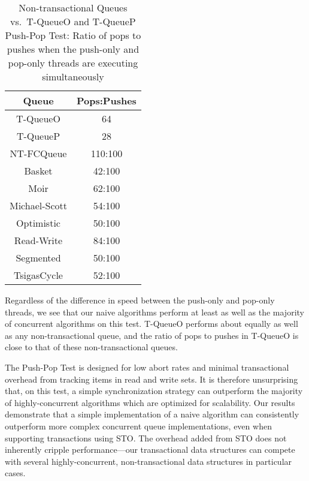 \begin{table}[t]
        \centering
    \begin{tabular}{|cc|}
        \hline
        Queue & Pops:Pushes\\
        \hline
            T-QueueO & 64\\
            T-QueueP & 28\\
            NT-FCQueue & 110:100\\
            Basket & 42:100\\
            Moir & 62:100\\
            Michael-Scott& 54:100\\
            Optimistic & 50:100\\
            Read-Write & 84:100\\
            Segmented & 50:100\\
            TsigasCycle & 52:100\\
        \hline
    \end{tabular}
    \caption{Non-transactional Queues vs.\ T-QueueO and T-QueueP Push-Pop Test: Ratio of pops to pushes when the push-only and pop-only threads are executing simultaneously}
    \label{tab:push_pop_ratio}
\end{table}

Regardless of the difference in speed between the push-only and pop-only threads, we see that our naive algorithms perform at least as well as the majority of concurrent algorithms on this test. 
T-QueueO performs about equally as well as any non-transactional queue, and the ratio of pops to pushes in T-QueueO is close to that of these non-transactional queues.

The Push-Pop Test is designed for low abort rates and minimal transactional overhead from tracking items in read and write sets. It is therefore unsurprising that, on this test, a simple synchronization strategy can outperform the majority of highly-concurrent algorithms which are optimized for scalability. 
Our results demonstrate that a simple implementation of a naive algorithm can consistently outperform more complex concurrent queue implementations, even when supporting transactions using STO. The overhead added from STO does not inherently cripple performance---our transactional data structures can compete with several highly-concurrent, non-transactional data structures in particular cases. 

\vspace{12pt}
\noindent{}


